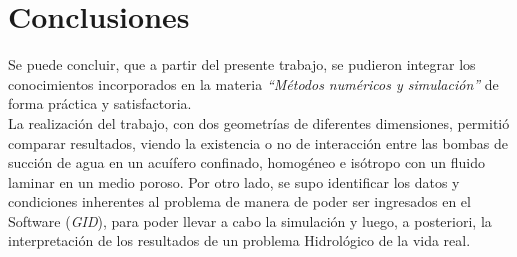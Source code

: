 \documentclass[10pt,a4paper,final]{article}
\begin{document}
\section{Conclusiones}
Se puede concluir, que a partir del presente trabajo, se pudieron integrar los conocimientos incorporados en la materia \emph{``Métodos numéricos y simulación''} de forma práctica y satisfactoria. \\
La realización del trabajo, con dos geometrías de diferentes dimensiones, permitió comparar resultados, viendo la existencia o no de interacción entre las bombas de succión de agua en un acuífero confinado, homogéneo e isótropo con un fluido laminar en un  medio poroso.
Por otro lado, se supo identificar los datos y condiciones inherentes al problema de manera de poder ser ingresados en el Software (\emph{GID}), para poder llevar a cabo la simulación y luego, a posteriori, la interpretación de los resultados de un problema Hidrológico de la vida real.
\end{document}
